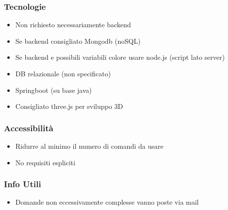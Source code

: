 \subsubsection{Tecnologie}
\begin{itemize}
    \item Non richiesto necessariamente backend
    \item Se backend consigliato Mongodb (noSQL)
    \item Se backend e possibili variabili colore usare node.js (script lato server) 
    \item DB relazionale (non specificato)
    \item Springboot (su base java)
    \item Consigliato three.js per sviluppo 3D
\end{itemize}
\subsubsection{Accessibilità}
\begin{itemize}
    \item Ridurre al minimo il numero di comandi da usare
    \item No requisiti espliciti
\end{itemize}
\subsubsection{Info Utili}
\begin{itemize}
    \item Domande non eccessivamente complesse vanno poste via mail
\end{itemize}
